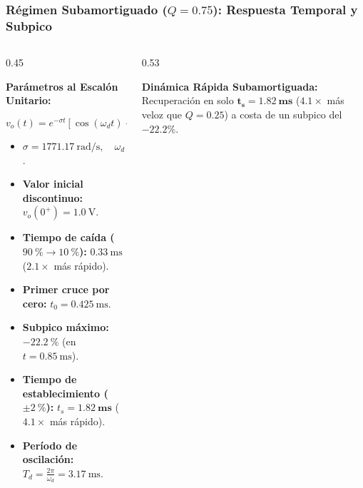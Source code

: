 \begin{frame}
  \frametitle{Régimen Subamortiguado ($Q = 0.75$): Respuesta Temporal y Subpico}

  \begin{columns}[c, onlytextwidth]
    \begin{column}{0.45\textwidth}
      \begin{tarjeta}
        {\fontsize{8.5pt}{10pt}\selectfont \textbf{\color{NavyDark} Parámetros al Escalón Unitario:}}\\[2pt]
        {\fontsize{7pt}{8.5pt}\selectfont
        \[ v_o(t) = e^{-\sigma t} [\cos(\omega_d t) - 0.8946 \sin(\omega_d t)] u(t) \]
        \begin{itemize}\setlength{\itemsep}{1.5pt}
          \item $\sigma = \qty{1771.17}{\radian\per\second}, \quad \omega_d = \qty{1979.75}{\radian\per\second}$.
          \item \textbf{Valor inicial discontinuo:} $v_o(0^+) = \qty{1.0}{\volt}$.
          \item \textbf{Tiempo de caída ($\qty{90}{\percent}\to\qty{10}{\percent}$):} $\qty{0.33}{\milli\second}$ ($2.1\times$ más rápido).
          \item \textbf{Primer cruce por cero:} $t_0 = \qty{0.425}{\milli\second}$.
          \item \textbf{Subpico máximo:} $\mathbf{\qty{-22.2}{\percent}}$ (en $t = \qty{0.85}{\milli\second}$).
          \item \textbf{Tiempo de establecimiento ($\pm\qty{2}{\percent}$):}
          $t_s = \mathbf{\qty{1.82}{\milli\second}}$ ($4.1\times$ más rápido).
          \item \textbf{Período de oscilación:} $T_d = \frac{2\pi}{\omega_d} = \qty{3.17}{\milli\second}$.
        \end{itemize}
        }
      \end{tarjeta}
    \end{column}

    \begin{column}{0.53\textwidth}
      \centering
      \vspace{3pt}
      \begin{tarjeta}[colframe=CardBorder, colback=CardBg, boxrule=0.5pt, top=3pt, bottom=3pt, left=5pt, right=5pt]
        {\fontsize{7.5pt}{9pt}\selectfont
        \textbf{\color{AlertAmber} Dinámica Rápida Subamortiguada:} Recuperación en solo $\mathbf{t_s = \qty{1.82}{\milli\second}}$ ($4.1\times$ más veloz que $Q=0.25$) a costa de un subpico del $\mathbf{-22.2\%}$.
        }
      \end{tarjeta}
    \end{column}
  \end{columns}
\end{frame}

